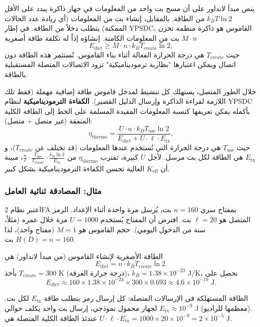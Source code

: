 \documentclass[12pt,a4paper]{article}
\newcommand{\Keff}{K_{\mathrm{eff}}}
\theoremstyle{remark}
\begin{document}
	ينص مبدأ لانداور \cite{Landauer1961} على أن مسح بت واحد من المعلومات في جهاز ذاكرة يبدد على الأقل \(k_B T \ln 2\) من الطاقة. بالمقابل، إنشاء بت من المعلومات (أي زيادة عدد الحالات الممكنة) يتطلب دخلاً من الطاقة. في إطار YPSDC، القاموس هو ذاكرة منظمة تخزن \(M \cdot n\) بت من المعلومات الكامنة. إنشاؤه إذاً له تكلفة طاقة أصغرية
	\begin{equation}
		E_{\text{dict}} \ge M \cdot n \cdot k_B T_{\text{create}} \ln 2, \label{eq:thermo-cost}
	\end{equation}
	حيث \(T_{\text{create}}\) هي درجة الحرارة الفعالة أثناء بناء القاموس. تُستثمر هذه الطاقة دون اتصال ويمكن اعتبارها "بطارية ترموديناميكية" تزود الاتصالات المتصلة المستقبلية بالطاقة.
	
	خلال الطور المتصل، يستهلك كل تنشيط لمدخل قاموس طاقة إضافية مهملة (فقط تلك اللازمة لقراءة الذاكرة وإرسال الدليل القصير). \textbf{الكفاءة الترموديناميكية} لنظام YPSDC بأكمله يمكن تعريفها كنسبة المعلومات المفيدة المسلمة على الخط إلى الطاقة الكلية المنفقة (غير متصل + متصل):
	\begin{equation}
		\eta_{\text{thermo}} = \frac{U \cdot n \cdot k_B T_{\text{use}} \ln 2}{E_{\text{dict}} + U \cdot \ell \cdot E_{\text{tx}}}, \label{eq:thermo}
	\end{equation}
	حيث \(T_{\text{use}}\) هي درجة الحرارة التي تُستخدم عندها المعلومات (قد تختلف عن \(T_{\text{create}}\))، و\(E_{\text{tx}}\) هي الطاقة لكل بت مرسل. لأجل \(U\) كبيرة، تقترب \(\eta_{\text{thermo}}\) من \(\frac{n}{\ell} \cdot \frac{T_{\text{use}}}{T_{\text{create}}} \cdot \frac{k_B \ln 2}{E_{\text{tx}}}\)، مبينة أن \(\Keff\) العالية تحسن الكفاءة الترموديناميكية بشكل كبير.
	
	\subsubsection{مثال: المصادقة ثنائية العامل}
	اعتبر نظام 2FA بمفتاح سري \(n = 160\) بت، يُرسل مرة واحدة أثناء الإعداد. الرمز المتصل هو \(\ell = 20\) بت. افترض أن المفتاح يُستخدم \(U = 1000\) مرة خلال عمره (مثلاً، سنة من الدخول اليومي). حجم القاموس هو \(M = 1\) (مفتاح واحد)، لذا \(H(D) = n = 160\) بت.
	
	الطاقة الأصغرية لإنشاء القاموس (من مبدأ لانداور) هي
	\[
	E_{\text{dict}} = n \cdot k_B T_{\text{create}} \ln 2.
	\]
	بأخذ \(T_{\text{create}} = 300\) K (درجة حرارة الغرفة)، \(k_B = 1.38 \times 10^{-23}\) J/K، نحصل على
	\[
	E_{\text{dict}} \approx 160 \times 1.38 \times 10^{-23} \times 300 \times 0.693 \approx 4.6 \times 10^{-19} \text{ J}.
	\]
	
	الطاقة المستهلكة في الإرسالات المتصلة: كل إرسال رمز يتطلب طاقة \(E_{\text{tx}}\) لكل بت. لجهاز محمول نموذجي، إرسال بت واحد يكلف حوالي \(E_{\text{tx}} \approx 10^{-9}\) J (معظمها للراديو). عندئذ الطاقة الكلية المتصلة هي \(U \cdot \ell \cdot E_{\text{tx}} = 1000 \times 20 \times 10^{-9} = 2 \times 10^{-5}\) J.
	
\end{document}
